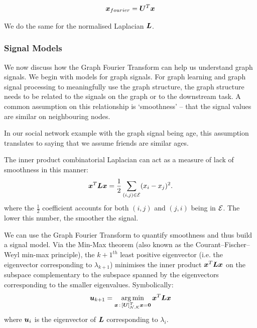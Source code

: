 \begin{equation}
    \bm{x}_{fourier} = \bm{U}^{T}\bm{x}
\end{equation}

\noindent We do the same for the normalised Laplacian $\bm{L}$.


\subsubsection{Signal Models}
We now discuss how the Graph Fourier Transform can help us understand graph signals. We begin with models for graph signals. For graph learning and graph signal processing to meaningfully use the graph structure, the graph structure needs to be related to the signals on the graph or to the downstream task. A common assumption on this relationship is `smoothness' -- that the signal values are similar on neighbouring nodes.

In our social network example with the graph signal being age, this assumption translates to saying that we assume friends are similar ages.

The inner product combinatorial Laplacian can act as a measure of lack of smoothness in this manner:
\begin{equation}
\bm{x}^{T}\bm{L}\bm{x} = \frac{1}{2}\sum_{(i,j) \in \mathcal{E}} (x_{i} - x_{j})^{2}.
\end{equation}
where the $\frac{1}{2}$ coefficient accounts for both $(i,j)$ and $(j,i)$ being in $\mathcal{E}$. The lower this number, the smoother the signal.



We can use the Graph Fourier Transform to quantify smoothness and thus build a signal model. Via the Min-Max theorem (also known as the Courant–Fischer–Weyl min-max principle), the $k+1^{th}$ least positive eigenvector  (i.e. the eigenvector corresponding to $\lambda_{k+1}$) minimises the inner product $\bm{x}^{T}\bm{L}\bm{x}$ on the subspace complementary to the subspace spanned by the eigenvectors corresponding to the smaller eigenvalues. Symbolically:
\begin{equation}
    \vect{u}_{k+1} = \argmin_{\vect{x}\,:\, \matrsubU{N}^{T}\vect{x} = \vect{0}} \vect{x}^{T}\matr{L}\vect{x}
\end{equation}
where $\bm{u}_{i}$ is the eigenvector of $\bm{L}$ corresponding to $\lambda_{i}$.

